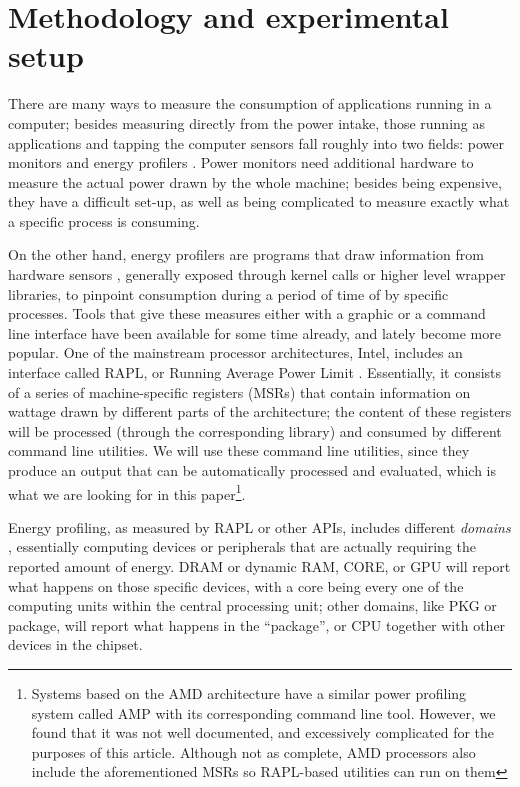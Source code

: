 \documentclass[a4paper,twoside]{article}
\begin{document}
\section{Methodology and experimental setup}
\label{sec:setup}

There are many ways to measure the consumption of applications running in a
computer; besides measuring directly from the power intake, those running as
applications and tapping the computer sensors fall roughly into two fields:
power monitors and energy profilers \cite{cruz21}. Power monitors need
additional hardware to measure the actual power drawn by the whole machine;
besides being expensive, they have a difficult set-up, as well as being
complicated to measure exactly what a specific process is consuming.

On the other hand, energy profilers are programs that draw information from
hardware sensors \cite{sinha2001jouletrack}, generally exposed through kernel
calls or higher level wrapper libraries, to pinpoint consumption during a period
of time of by specific processes. Tools that give these measures either with a
graphic or a command line interface have been available for some time already,
and lately become more popular. One of the mainstream processor architectures,
Intel, includes an interface called RAPL, or Running Average Power Limit
\cite{rapl}. Essentially, it consists of a series of machine-specific registers
(MSRs) that contain information on wattage drawn by different parts of the
architecture; the content of these registers will be processed (through the
corresponding library) and consumed by different command line utilities. We will
use these command line utilities, since they produce an output that can be
automatically processed and evaluated, which is what we are looking for in this
paper\footnote{Systems based on the AMD architecture have a similar power
  profiling system called AMP with its corresponding command line
  tool. However, we found that it was not well documented, and excessively
  complicated for the purposes of this article. Although not as complete, AMD
  processors also include the aforementioned MSRs so RAPL-based utilities can
  run on them}.

Energy profiling, as measured by RAPL or other APIs, includes different
\emph{domains} \cite{khan2015energy}, essentially computing devices or
peripherals that are actually requiring the reported amount of energy. DRAM or
dynamic RAM, CORE, or GPU will report what happens on those specific devices,
with a core being every one of the computing units within the central processing
unit; other domains, like PKG or package, will report what happens in the
``package'', or CPU together with other devices in the chipset.
\end{document}
